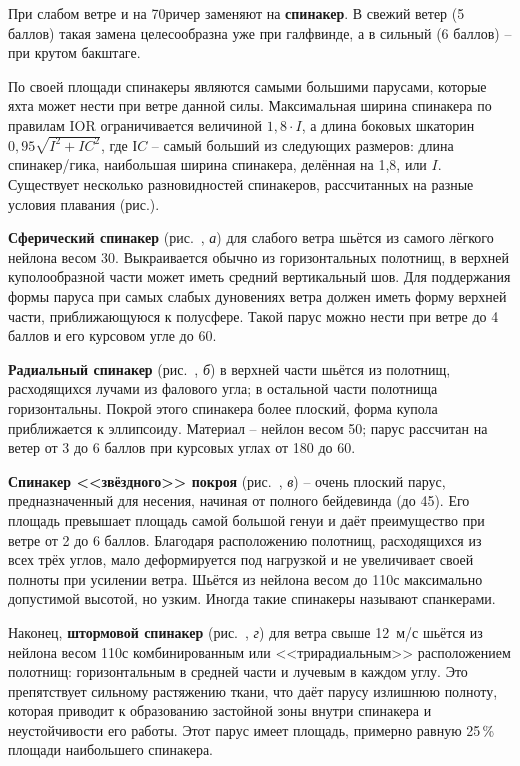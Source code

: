 При слабом ветре и на 70\gr ричер заменяют на \textbf{спинакер}. В
свежий ветер (5 баллов) такая замена целесообразна уже при галфвинде,
а в сильный (6 баллов) \--- при крутом бакштаге.

По своей площади спинакеры являются самыми большими парусами, которые
яхта может нести при ветре данной силы. Максимальная ширина спинакера
по правилам IOR ограничивается величиной $1,8 \cdot I$, а длина
боковых шкаторин $0,95 \sqrt{I^2 + IC^2}$, где $ІC$ \--- самый больший
из следующих размеров: длина спинакер\-/гика, наибольшая ширина
спинакера, делённая на 1,8, или $I$. Существует несколько
разновидностей спинакеров, рассчитанных на разные условия плавания
(рис.).

\textbf{Сферический спинакер}
(рис.~, \textit{а}) для слабого ветра шьётся из самого лёгкого
нейлона весом 30\gmsq. Выкраивается обычно из горизонтальных полотнищ,
в верхней куполообразной части может иметь средний вертикальный
шов. Для поддержания формы паруса при самых слабых дуновениях ветра
должен иметь форму верхней части, приближающуюся к полусфере. Такой
парус можно нести при ветре до 4 баллов и его курсовом угле до 60\gr.

\textbf{Радиальный спинакер}
(рис.~, \textit{б}) в верхней части шьётся из полотнищ,
расходящихся лучами из фалового угла; в остальной части полотнища
горизонтальны. Покрой этого спинакера более плоский, форма купола
приближается к эллипсоиду. Материал \--- нейлон весом 50\gmsq;
парус рассчитан на ветер от 3 до 6 баллов при курсовых углах от 180\gr
до 60\gr.

\textbf{Спинакер <<звёздного>> покроя}
(рис.~, \textit{в}) \--- очень плоский парус, предназначенный
для несения, начиная от полного бейдевинда (до 45\gr). Его площадь
превышает площадь самой большой генуи и даёт преимущество при ветре от
2 до 6 баллов. Благодаря расположению полотнищ, расходящихся из всех
трёх углов, мало деформируется под нагрузкой и не увеличивает своей
полноты при усилении ветра. Шьётся из нейлона весом до 110\gmsq с
максимально допустимой высотой, но узким. Иногда такие спинакеры
называют спанкерами.

Наконец, \textbf{штормовой спинакер}
(рис.~, \textit{г}) для ветра свыше 12~м/с шьётся из нейлона
весом 110\gmsq с комбинированным или <<трирадиальным>> расположением
полотнищ: горизонтальным в средней части и лучевым в каждом углу. Это
препятствует сильному растяжению ткани, что даёт парусу излишнюю
полноту, которая приводит к образованию застойной зоны внутри
спинакера и неустойчивости его работы. Этот парус имеет площадь,
примерно равную 25\,\% площади наибольшего спинакера.

